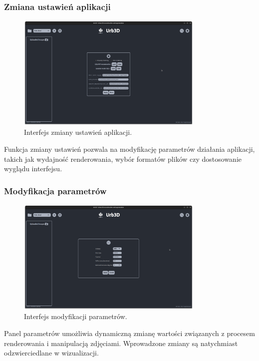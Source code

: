 \subsubsection{Zmiana ustawień aplikacji}
\begin{figure}[h!]
    \centering
    \includegraphics[width=0.8\textwidth]{img/wizualizacja/ui_ustawienia.png}
    \caption{Interfejs zmiany ustawień aplikacji.}
\end{figure}

Funkcja zmiany ustawień pozwala na modyfikację parametrów działania aplikacji, takich jak wydajność renderowania, wybór formatów plików czy dostosowanie wyglądu interfejsu.

\subsubsection{Modyfikacja parametrów}
\begin{figure}[h!]
    \centering
    \includegraphics[width=0.8\textwidth]{img/wizualizacja/ui_parametry.png}
    \caption{Interfejs modyfikacji parametrów.}
\end{figure}

Panel parametrów umożliwia dynamiczną zmianę wartości związanych z procesem renderowania i manipulacją zdjęciami. Wprowadzone zmiany są natychmiast odzwierciedlane w wizualizacji.

